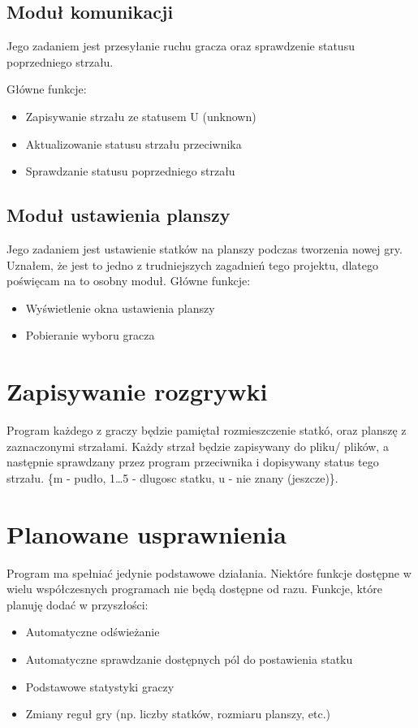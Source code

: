 \documentclass[a4paper]{article}
\begin{document}
\subsection{Moduł komunikacji}
Jego zadaniem jest przesyłanie ruchu gracza oraz sprawdzenie statusu poprzedniego strzału.

Główne funkcje:
\begin{itemize}
	\item Zapisywanie strzału ze statusem U (unknown)
	\item Aktualizowanie statusu strzału przeciwnika
	\item Sprawdzanie statusu poprzedniego strzału
\end{itemize}

\subsection{Moduł ustawienia planszy}
Jego zadaniem jest ustawienie statków na planszy podczas tworzenia nowej gry.
Uznałem, że jest to jedno z trudniejszych zagadnień tego projektu, dlatego poświęcam na to osobny moduł.
Główne funkcje:
\begin{itemize}
	\item Wyświetlenie okna ustawienia planszy
	\item Pobieranie wyboru gracza
\end{itemize}

\section{Zapisywanie rozgrywki}
Program każdego z graczy będzie pamiętał rozmieszczenie statkó, oraz planszę z zaznaczonymi strzałami.
Każdy strzał będzie zapisywany do pliku/ plików, a następnie sprawdzany przez program przeciwnika i dopisywany status tego strzału.
\{m - pudło, 1\dots5 - dlugosc statku, u - nie znany (jeszcze)\}.

\section{Planowane usprawnienia}
Program ma spełniać jedynie podstawowe działania. Niektóre funkcje dostępne w wielu współczesnych programach nie będą dostępne od razu.
Funkcje, które planuję dodać w przyszłości:
\begin{itemize}
	\item Automatyczne odświeżanie
	\item Automatyczne sprawdzanie dostępnych pól do postawienia statku
	\item Podstawowe statystyki graczy
	\item Zmiany reguł gry (np. liczby statków, rozmiaru planszy, etc.)
\end{itemize}
\end{document}

